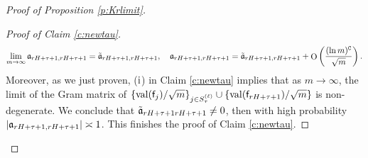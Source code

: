 \documentclass{article}
\numberwithin{equation}{section}
\newcommand{\fC}{{\mathtt C}}
\newcommand{\fa}{{\frak a}}
\newcommand{\sfe}{{\mathsf e}}
\newcommand{\sff}{{\mathsf f}}
\DeclareMathOperator{\OO}{O}
\newcommand{\1}{\mathds{1}}
\theoremstyle{plain} %
\newtheorem{claim}[theorem]{Claim}
\newcommand{\val}{{\rm val}}
\newcommand{\LinMul}{{\rm LinMul}}
\begin{document}
\begin{proof}[Proof of Proposition \ref{p:Krlimit}]
\begin{proof}[Proof of Claim \ref{c:newtau}]
\begin{align*}
\lim_{m\rightarrow \infty}\fa_{rH+\tau+1,rH+\tau+1}=\tilde \fa_{rH+\tau+1,rH+\tau+1}, \quad \fa_{rH+\tau+1,rH+\tau+1}=\tilde \fa_{rH+\tau+1,rH+\tau+1}+\OO\left(\frac{(\ln m)^{\fC}}{\sqrt m}\right).
\end{align*}
Moreover, as we just proven, (${\rm i}$) in Claim \ref{c:newtau} implies that as $m\rightarrow\infty$, the limit of the Gram matrix of $\{\val(\sff_j)/\sqrt m\}_{j\in S_\tau^{(\ell)}}\cup\{\val(\sff_{rH+\tau+1})/\sqrt m\}$ is non-degenerate. We conclude that $\tilde \fa_{rH+\tau+1 rH+\tau+1}\neq0$, then with high probability $|\fa_{rH+\tau+1,rH+\tau+1}|\asymp 1$. This finishes the proof of Claim \ref{c:newtau}.



%


\end{proof}
\end{proof}
\end{document}
